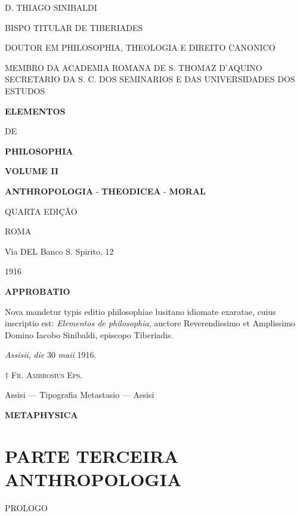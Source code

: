
  D. THIAGO SINIBALDI

BISPO TITULAR DE TIBERIADES

DOUTOR EM PHILOSOPHIA, THEOLOGIA E DIREITO CANONICO

MEMBRO DA ACADEMIA ROMANA DE S. THOMAZ D'AQUINO SECRETARIO DA S. C. DOS SEMINARIOS E DAS UNIVERSIDADES DOS ESTUDOS

\textbf{ELEMENTOS}

DE

\textbf{PHILOSOPHIA}

\textbf{VOLUME II}

\textbf{ANTHROPOLOGIA} - \textbf{THEODICEA} - \textbf{MORAL}

QUARTA EDIÇÃO

ROMA

Via DEL Banco S. Spirito, 12

1916

 \textbf{APPROBATIO}

Nova mandetur typis editio philosophiae lusitano idiomate exaratae, cuius inscriptio est: \emph{Elementos de philosophia}, auctore Reverendissimo et Amplissimo Domino Iacobo Sinibaldi, episcopo Tiberiadis.

\emph{Assisii}, \emph{die} 30 \emph{maii} 1916.

† \textsc{Fr. Ambrosius Eps.}

Assisi --- Tipografia Metastasio --- Assisi

 \textbf{METAPHYSICA}


\part*{PARTE TERCEIRA\\[0.3em]\large ANTHROPOLOGIA}

PROLOGO


